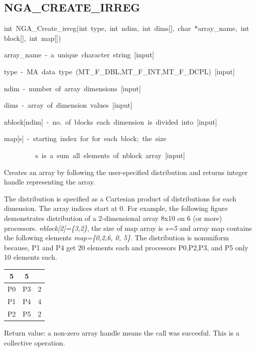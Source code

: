\subsection*{\label{sub:NGA_CREATE_IRREG}NGA\_CREATE\_IRREG}
\begin{lyxcode}
int~NGA\_Create\_irreg(int~type,~int~ndim,~int~dims{[}{]},~char~{*}array\_name,~int~block{[}{]},~int~map{[}{]})



array\_name~-~a~unique~character~string~{[}input{]}~

type~-~MA~data~type~(MT\_F\_DBL,MT\_F\_INT,MT\_F\_DCPL)~{[}input{]}~

ndim~-~number~of~array~dimensions~{[}input{]}~

dims~-~array~of~dimension~values~{[}input{]}~

nblock{[}ndim{]}~-~no.~of~blocks~each~dimension~is~divided~into~{[}input{]}~

map{[}s{]}~-~starting~index~for~for~each~block;~the~size~

~~~~~~~~~s~is~a~sum~all~elements~of~nblock~array~{[}input{]}
\end{lyxcode}
Creates an array by following the user-specified distribution and
returns integer handle representing the array.

The distribution is specified as a Cartesian product of distributions
for each dimension. The array indices start at 0. For example, the
following figure demonstrates distribution of a 2-dimensional array
8x10 on 6 (or more) processors. \emph{nblock{[}2{]}=\{3,2\}}, the
size of map array is \emph{s=5} and array map contains the following
elements \emph{map=\{0,2,6, 0, 5\}}. The distribution is nonuniform
because, P1 and P4 get 20 elements each and processors P0,P2,P3, and
P5 only 10 elements each. 

\begin{tabular}{|c|c|c|}
\cline{1-2} 
5 & 5 & \multicolumn{1}{c}{}\tabularnewline
\hline 
P0 & P3 & 2\tabularnewline
\hline 
P1 & P4 & 4\tabularnewline
\hline 
P2 & P5 & 2\tabularnewline
\hline
\end{tabular}

Return value: a non-zero array handle means the call was succesful.
This is a collective operation.


